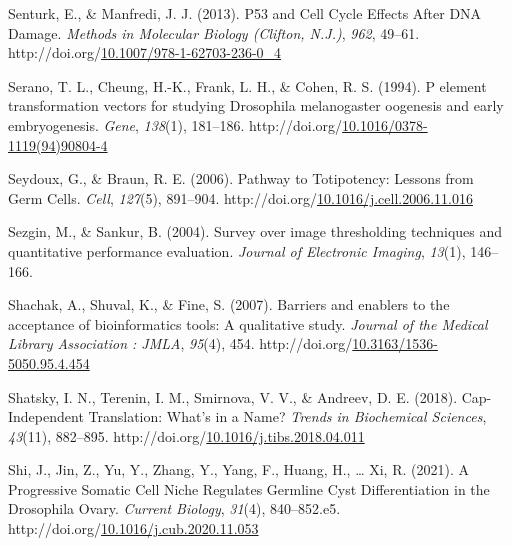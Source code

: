 \documentclass[12pt,oneside]{reedthesis}
\newlength{\cslhangindent}
\newenvironment{CSLReferences}[2] %
 {%
  \setlength{\parindent}{0pt}
  \ifodd #1 \everypar{\setlength{\hangindent}{\cslhangindent}}\ignorespaces\fi
  \ifnum #2 > 0
  \setlength{\parskip}{#2\baselineskip}
  \fi
 }%
 {}
\begin{document}
\begin{CSLReferences}{1}{0}
\leavevmode{}%
Senturk, E., \& Manfredi, J. J. (2013). P53 and {Cell Cycle Effects After DNA Damage}. \emph{Methods in Molecular Biology (Clifton, N.J.)}, \emph{962}, 49--61. http://doi.org/\href{https://doi.org/10.1007/978-1-62703-236-0_4}{10.1007/978-1-62703-236-0\_4}

\leavevmode{}%
Serano, T. L., Cheung, H.-K., Frank, L. H., \& Cohen, R. S. (1994). P element transformation vectors for studying {Drosophila} melanogaster oogenesis and early embryogenesis. \emph{Gene}, \emph{138}(1), 181--186. http://doi.org/\href{https://doi.org/10.1016/0378-1119(94)90804-4}{10.1016/0378-1119(94)90804-4}

\leavevmode{}%
Seydoux, G., \& Braun, R. E. (2006). Pathway to {Totipotency}: {Lessons} from {Germ Cells}. \emph{Cell}, \emph{127}(5), 891--904. http://doi.org/\href{https://doi.org/10.1016/j.cell.2006.11.016}{10.1016/j.cell.2006.11.016}

\leavevmode{}%
Sezgin, M., \& Sankur, B. (2004). Survey over image thresholding techniques and quantitative performance evaluation. \emph{Journal of Electronic Imaging}, \emph{13}(1), 146--166.

\leavevmode{}%
Shachak, A., Shuval, K., \& Fine, S. (2007). Barriers and enablers to the acceptance of bioinformatics tools: A qualitative study. \emph{Journal of the Medical Library Association : JMLA}, \emph{95}(4), 454. http://doi.org/\href{https://doi.org/10.3163/1536-5050.95.4.454}{10.3163/1536-5050.95.4.454}

\leavevmode{}%
Shatsky, I. N., Terenin, I. M., Smirnova, V. V., \& Andreev, D. E. (2018). Cap-{Independent Translation}: {What}'s in a {Name}? \emph{Trends in Biochemical Sciences}, \emph{43}(11), 882--895. http://doi.org/\href{https://doi.org/10.1016/j.tibs.2018.04.011}{10.1016/j.tibs.2018.04.011}

\leavevmode{}%
Shi, J., Jin, Z., Yu, Y., Zhang, Y., Yang, F., Huang, H., \ldots{} Xi, R. (2021). A {Progressive Somatic Cell Niche Regulates Germline Cyst Differentiation} in the {Drosophila Ovary}. \emph{Current Biology}, \emph{31}(4), 840--852.e5. http://doi.org/\href{https://doi.org/10.1016/j.cub.2020.11.053}{10.1016/j.cub.2020.11.053}


\end{CSLReferences}
\end{document}
